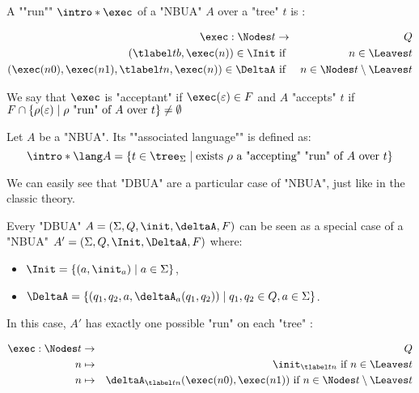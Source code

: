 \documentclass[a4paper,UKenglish,cleveref, autoref, thm-restate]{lipics-v2021}
\begin{document}
\begin{definition}
	\AP A ""run"" $\intro* \exec$ of a "NBUA" $A$ over a "tree" $t$ is :

	\begin{eqnarray*}
		\exec : \Nodes t  &\to& Q \\
		(\tlabel t b,  \exec (n) ) \in \Init &\text{ if }& n \in \Leaves t \\
		(\exec (n0), \exec (n1), \tlabel t n, \exec (n)) \in \DeltaA &\text{ if }& n \in \Nodes t \setminus \Leaves t
	\end{eqnarray*}

	We say that $\exec$ is "acceptant" if $\exec (\varepsilon) \in F$ and $A$ "accepts" $t$ if
	$F \cap \left\{\rho(\varepsilon) \mid \text{$\rho$ "run" of~$A$ over~$t$}\right\} \neq \emptyset$
\end{definition}


\begin{definition}
	\AP Let $A$ be a "NBUA". Its ""associated language"" is defined as:
	\[\intro* \lang A = \setdef {t \in \tree_{\Sigma}} {\text{exists $\rho$ a "accepting" "run" of $A$ over $t$}} \]
\end{definition}


We can easily see that "DBUA" are a particular case of "NBUA", just like in the classic theory.

\begin{remark}
	Every "DBUA" $A = (\Sigma, Q, \init, \deltaA, F)$ can be seen as a special case of a "NBUA"
	$A' = (\Sigma, Q, \Init, \DeltaA, F)$ where:
	\begin{itemize}
		\item $\Init = \setdef{(a, \init_a)}{a \in \Sigma}$,
		\item $\DeltaA = \setdef{(q_1, q_2, a, \deltaA_a(q_1, q_2))}{q_1, q_2 \in Q, a \in \Sigma}$.
	\end{itemize}

	In this case, $A'$ has exactly one possible "run" on each "tree" :

	\begin{eqnarray*}
		\exec : \Nodes t  &\to & Q \\
		n  &\mapsto& \init_{\tlabel t n} \text{ if } n \in \Leaves t \\
		n  &\mapsto& \deltaA_{\tlabel t n}(\exec (n0), \exec (n1)) \text{ if } n \in \Nodes t  \setminus \Leaves t
	\end{eqnarray*}
\end{remark}
\end{document}
